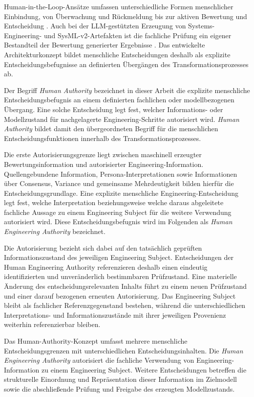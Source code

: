 Human-in-the-Loop-Ansätze umfassen unterschiedliche Formen menschlicher
Einbindung, von Überwachung und Rückmeldung bis zur aktiven Bewertung und
Entscheidung \cite{MosqueiraRey2023,Lazaros2026}. Auch bei der
LLM-gestützten Erzeugung von Systems-Engineering- und SysML-v2-Artefakten ist
die fachliche Prüfung ein eigener Bestandteil der Bewertung generierter
Ergebnisse \cite{Topcu2025,Stein2026}. Das entwickelte Architekturkonzept
bildet menschliche Entscheidungen deshalb als explizite
Entscheidungsbefugnisse an definierten Übergängen des
Transformationsprozesses ab.

Der Begriff \emph{Human Authority} bezeichnet in dieser Arbeit die explizite
menschliche Entscheidungsbefugnis an einem definierten fachlichen oder
modellbezogenen Übergang. Eine solche Entscheidung legt fest, welcher
Informations- oder Modellzustand für nachgelagerte Engineering-Schritte
autorisiert wird. \emph{Human Authority} bildet damit den übergeordneten
Begriff für die menschlichen Entscheidungsfunktionen innerhalb des
Transformationsprozesses.

Die erste Autorisierungsgrenze liegt zwischen maschinell erzeugter
Bewertungsinformation und autorisierter Engineering-Information.
Quellengebundene Information, Persona-Interpretationen sowie Informationen
über Consensus, Variance und gemeinsame Mehrdeutigkeit bilden hierfür die
Entscheidungsgrundlage. Eine explizite menschliche Engineering-Entscheidung
legt fest, welche Interpretation beziehungsweise welche daraus abgeleitete
fachliche Aussage zu einem Engineering Subject für die weitere Verwendung
autorisiert wird. Diese Entscheidungsbefugnis wird im Folgenden als
\emph{Human Engineering Authority} bezeichnet.

Die Autorisierung bezieht sich dabei auf den tatsächlich geprüften
Informationszustand des jeweiligen Engineering Subject. Entscheidungen der
Human Engineering Authority referenzieren deshalb einen eindeutig
identifizierten und unveränderlich bestimmbaren Prüfzustand. Eine materielle
Änderung des entscheidungsrelevanten Inhalts führt zu einem neuen
Prüfzustand und einer darauf bezogenen erneuten Autorisierung. Das
Engineering Subject bleibt als fachlicher Referenzgegenstand bestehen,
während die unterschiedlichen Interpretations- und Informationszustände mit
ihrer jeweiligen Provenienz weiterhin referenzierbar bleiben.

Das Human-Authority-Konzept umfasst mehrere menschliche
Entscheidungsgrenzen mit unterschiedlichen Entscheidungsinhalten. Die
\emph{Human Engineering Authority} autorisiert die fachliche Verwendung von
Engineering-Information zu einem Engineering Subject. Weitere Entscheidungen
betreffen die strukturelle Einordnung und Repräsentation dieser Information
im Zielmodell sowie die abschließende Prüfung und Freigabe des erzeugten
Modellzustands.

